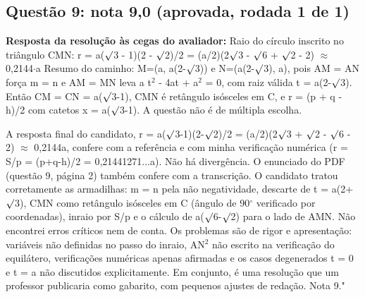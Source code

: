 \documentclass{article}%
\begin{document}
\subsection*{Questão 9: nota 9,0 (aprovada, rodada 1 de 1)}%
\textbf{Resposta da resolução às cegas do avaliador:} Raio do círculo inscrito no triângulo CMN:\newline%
\newline%
r = a($\surd$3 - 1)(2 - $\surd$2)/2 = (a/2)(2$\surd$3 - $\surd$6 + $\surd$2 - 2) $\approx$ 0,2144$\cdot$a\newline%
\newline%
Resumo do caminho: M=(a, a(2-$\surd$3)) e N=(a(2-$\surd$3), a), pois AM = AN força m = n e AM = MN leva a t$^2$ - 4at + a$^2$ = 0, com raiz válida t = a(2-$\surd$3). Então CM = CN = a($\surd$3-1), CMN é retângulo isósceles em C, e r = (p + q - h)/2 com catetos x = a($\surd$3-1). A questão não é de múltipla escolha.\par %
A resposta final do candidato, r = a($\surd$3-1)(2-$\surd$2)/2 = (a/2)(2$\surd$3 + $\surd$2 - $\surd$6 - 2) $\approx$ 0,2144a, confere com a referência e com minha verificação numérica (r = S/p = (p+q-h)/2 = 0,21441271...a). Não há divergência. O enunciado do PDF (questão 9, página 2) também confere com a transcrição. O candidato tratou corretamente as armadilhas: m = n pela não negatividade, descarte de t = a(2+$\surd$3), CMN como retângulo isósceles em C (ângulo de 90$^\circ$ verificado por coordenadas), inraio por S/p e o cálculo de a($\surd$6-$\surd$2) para o lado de AMN. Não encontrei erros críticos nem de conta. Os problemas são de rigor e apresentação: variáveis não definidas no passo do inraio, AN$^2$ não escrito na verificação do equilátero, verificações numéricas apenas afirmadas e os casos degenerados t = 0 e t = a não discutidos explicitamente. Em conjunto, é uma resolução que um professor publicaria como gabarito, com pequenos ajustes de redação. Nota 9."%
\end{document}
